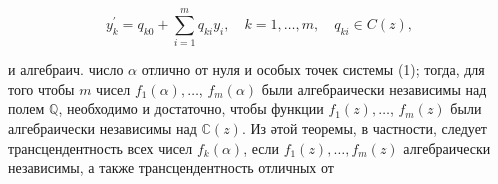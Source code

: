 \documentclass[10pt]{article}
\begin{document}
\[

y_{k}^{\prime}=q_{k 0}+\sum_{i=1}^{m} q_{k i} y_{i}, \quad k=1, \ldots, m, \quad q_{k i} \in C(z),

\]



и алгебраич. число $\alpha$ отлично от нуля и особых точек системы (1); тогда, для того чтобы $m$ чисел $f_{1}(\alpha), \ldots$, $f_{m}(\alpha)$ были алгебраически независимы над полем $\mathbb{Q}$, необходимо и достаточно, чтобы функции $f_{1}(z), \ldots$, $f_{m}(z)$ были алгебраически независимы над $\mathbb{C}(z)$. Из әтой теоремы, в частности, следует трансцендентность всех чисел $f_{k}(\alpha)$, если $f_{1}(z), \ldots, f_{m}(z)$ алгебраически независимы, а также трансцендентность отличных от
\end{document}
